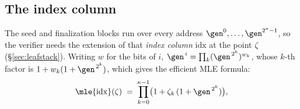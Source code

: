 \subsection{The index column}\label{sec:idxcol}

The seed and finalization blocks run over every address $\gen^{0},\dots,\gen^{2^{\kappa}-1}$, so the verifier needs the extension of that \emph{index column} $\mathrm{idx}$ at the point $\zeta$ (\S\ref{sec:leafstack}). Writing $w$ for the bits of $i$, $\gen^{\,i}=\prod_k(\gen^{\,2^{k}})^{w_k}$, whose $k$-th factor is $1+w_k(1+\gen^{\,2^{k}})$, which gives the efficient MLE formula:
\[
  \mle{\mathrm{idx}}(\zeta)\;=\;\prod_{k=0}^{\kappa-1}\bigl(1+\zeta_k\,(1+\gen^{\,2^{k}})\bigr),
\]
